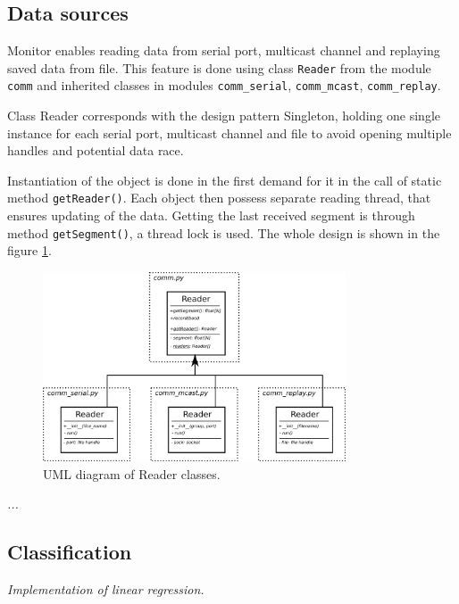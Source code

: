 \subsection*{Data sources}
Monitor enables reading data from serial port, multicast channel and replaying saved data from file.
This feature is done using class \texttt{Reader} from the module \texttt{comm} and inherited classes
in modules \texttt{comm\_serial}, \texttt{comm\_mcast}, \texttt{comm\_replay}.

Class Reader corresponds with the design pattern Singleton, holding one single instance for each
serial port, multicast channel and file to avoid opening multiple handles and potential data race.

Instantiation of the object is done in the first demand for it in the call of static method \texttt{getReader()}.
Each object then possess separate reading thread, that ensures updating of the data. Getting the last
received segment is through method \texttt{getSegment()}, a thread lock is used. The whole design is shown
in the figure \ref{fig:class_src}.

\begin{figure}[h!]
\begin{center}
\includegraphics[width=0.8\textwidth]{img/class_src.png}
\caption{UML diagram of Reader classes. \label{fig:class_src}}
\end{center}
\end{figure}

{\it ...}

\subsection*{Classification}
{\it Implementation of linear regression.}








